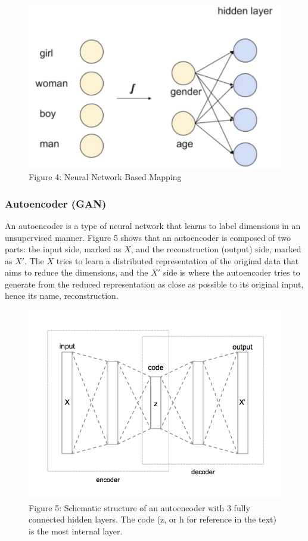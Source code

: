 \documentclass[paper=a4, fontsize=12pt]{scrartcl}
\begin{document}
\begin{figure}
  \includegraphics[width=\linewidth]{nnlm.png}
  \caption{Figure 4: Neural Network Based Mapping}
  \label{fig:nnlm}
\end{figure}
\subsubsection{Autoencoder (GAN)}
An autoencoder is a type of neural network that learns to label dimensions in an unsupervised manner. Figure 5 shows that an autoencoder is composed of two parts: the input side, marked as $X$, and the reconstruction (output) side, marked as $X'$. The $X$ tries to learn a distributed representation of the original data that aims to reduce the dimensions, and the $X'$ side is where the autoencoder tries to generate from the reduced representation as close as possible to its original input, hence its name, reconstruction. 
\begin{figure}
  \includegraphics[width=\linewidth]{Autoencoder_structure.png}
  \caption{Figure 5: Schematic structure of an autoencoder with 3 fully connected hidden layers. The code (z, or h for reference in the text) is the most internal layer.}
  \label{fig:autoencoder}
\end{figure}
\end{document}
